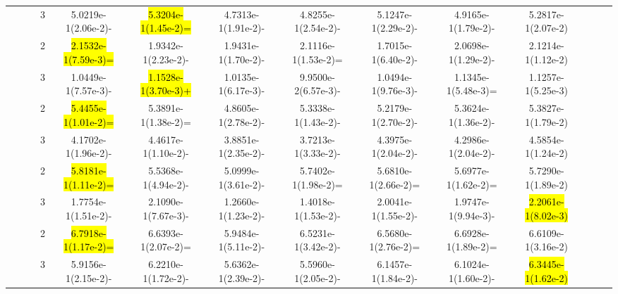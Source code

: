 \documentclass[a4paper,fleqn]{cas-dc}
\newcommand{\highlight}[1]{
	\begingroup
	\sethlcolor{Seashell}%
	\hl{#1}%
	\endgroup
}
\begin{document}
\begin{sloppypar}
\begin{table}[ht]
{\begin{tabular}{ccccccccccccc}
					\multirow{8}{*}{~}&\multirow{2}{*}{~}&3	&5.0219e-1(2.06e-2)-	&\highlight{5.3204e-1(1.45e-2)=}	&4.7313e-1(1.91e-2)-	&4.8255e-1(2.54e-2)-	&5.1247e-1(2.29e-2)-	&4.9165e-1(1.79e-2)-	&5.2817e-1(2.07e-2)\\
					
					
					
					\multirow{8}{*}{~}&\multirow{2}{*}{ZCAT10}&2	&\highlight{2.1532e-1(7.59e-3)=}	&1.9342e-1(2.23e-2)-	&1.9431e-1(1.70e-2)-	&2.1116e-1(1.53e-2)=	&1.7015e-1(6.40e-2)-	&2.0698e-1(1.29e-2)-	&2.1214e-1(1.12e-2)\\
					
					\multirow{8}{*}{~}&\multirow{2}{*}{~}&3	&1.0449e-1(7.57e-3)-	&\highlight{1.1528e-1(3.70e-3)+}	&1.0135e-1(6.17e-3)-	&9.9500e-2(6.57e-3)-	&1.0494e-1(9.76e-3)-	&1.1345e-1(5.48e-3)=	&1.1257e-1(5.25e-3)\\
					\hline
					
					
					\multirow{6}{*}{Disconnected}&\multirow{2}{*}{ZCAT11}&2 &\highlight{5.4455e-1(1.01e-2)=}	&5.3891e-1(1.38e-2)=	&4.8605e-1(2.78e-2)-	&5.3338e-1(1.43e-2)-	&5.2179e-1(2.70e-2)-	&5.3624e-1(1.36e-2)-	&5.3827e-1(1.79e-2)\\
					
					\multirow{6}{*}{~}&\multirow{2}{*}{~}&3  &4.1702e-1(1.96e-2)-
					&4.4617e-1(1.10e-2)-	&3.8851e-1(2.35e-2)-	&3.7213e-1(3.33e-2)-	&4.3975e-1(2.04e-2)-	&4.2986e-1(2.04e-2)-	&4.5854e-1(1.24e-2)\\
					
					
					
					\multirow{6}{*}{~}&\multirow{2}{*}{ZCAT12}&2	&\highlight{5.8181e-1(1.11e-2)=}		&5.5368e-1(4.94e-2)-	&5.0999e-1(3.61e-2)-	&5.7402e-1(1.98e-2)=	&5.6810e-1(2.66e-2)=	&5.6977e-1(1.62e-2)=	&5.7290e-1(1.89e-2)\\
					
					\multirow{6}{*}{~}&\multirow{2}{*}{~}&3		&1.7754e-1(1.51e-2)-		&2.1090e-1(7.67e-3)-	&1.2660e-1(1.23e-2)-	&1.4018e-1(1.53e-2)-	&2.0041e-1(1.55e-2)-	&1.9747e-1(9.94e-3)-	&\highlight{2.2061e-1(8.02e-3)}\\			
					
					
					
					\multirow{6}{*}{~}&\multirow{2}{*}{ZCAT13}&2 &\highlight{6.7918e-1(1.17e-2)=}	&6.6393e-1(2.07e-2)=	&5.9484e-1(5.11e-2)-	&6.5231e-1(3.42e-2)-	&6.5680e-1(2.76e-2)=	&6.6928e-1(1.89e-2)=	&6.6109e-1(3.16e-2)\\
					
					\multirow{6}{*}{~}&\multirow{2}{*}{~}&3		&5.9156e-1(2.15e-2)-	&6.2210e-1(1.72e-2)-	&5.6362e-1(2.39e-2)-	&5.5960e-1(2.05e-2)-	&6.1457e-1(1.84e-2)-	&6.1024e-1(1.60e-2)-	&\highlight{6.3445e-1(1.62e-2)}\\
					\hline
					

\end{tabular}}
\end{table}
\end{sloppypar}
\end{document}
